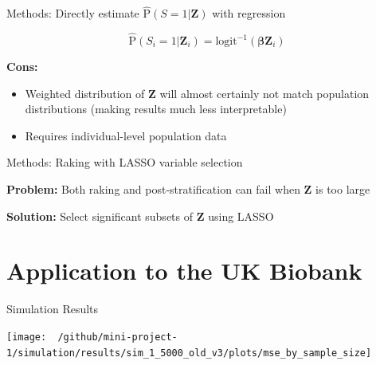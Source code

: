 \documentclass[
  ignorenonframetext,
]{beamer}
\providecommand{\tightlist}{%
  \setlength{\itemsep}{0pt}\setlength{\parskip}{0pt}}
\begin{document}
\begin{frame}{Methods: Directly estimate
\(\hat{\text{P}}(S = 1| \mathbf{Z})\) with regression}
\protect\hypertarget{methods-directly-estimate-hattextps-1-mathbfz-with-regression}{}

\[\hat{\text{P}}(S_i = 1 | \mathbf{Z}_i) = \text{logit}^{-1}(\boldsymbol{\beta}\mathbf{Z}_i)\]

\textbf{Cons:}

\begin{itemize}
\tightlist
\item
  Weighted distribution of \(\mathbf{Z}\) will almost certainly not
  match population distributions (making results much less
  interpretable)
\item
  Requires individual-level population data
\end{itemize}

\end{frame}

\begin{frame}{Methods: Raking with LASSO variable selection}
\protect\hypertarget{methods-raking-with-lasso-variable-selection}{}

\textbf{Problem:} Both raking and post-stratification can fail when
\(\mathbf{Z}\) is too large

\textbf{Solution:} Select significant subsets of \(\mathbf{Z}\) using
LASSO

\end{frame}

\hypertarget{application-to-the-uk-biobank}{%
\section{Application to the UK
Biobank}\label{application-to-the-uk-biobank}}

\begin{frame}{Simulation Results}
\protect\hypertarget{simulation-results}{}

\center

\texttt{[image: ~/github/mini-project-1/simulation/results/sim\_1\_5000\_old\_v3/plots/mse\_by\_sample\_size]}

\end{frame}
\end{document}
